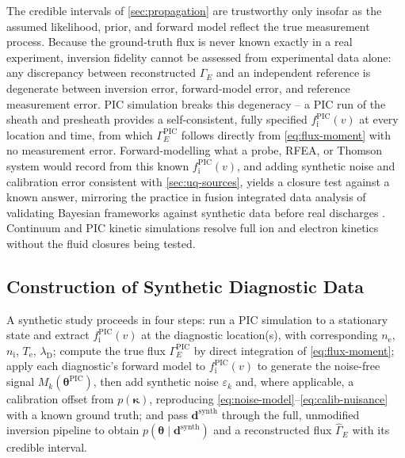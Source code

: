 The credible intervals of \cref{sec:propagation} are trustworthy only insofar as the assumed likelihood, prior, and forward model reflect the true measurement process. Because the ground-truth flux is never known exactly in a real experiment, inversion fidelity cannot be assessed from experimental data alone: any discrepancy between reconstructed $\Gamma_{E}$ and an independent reference is degenerate between inversion error, forward-model error, and reference measurement error. PIC simulation breaks this degeneracy -- a PIC run of the sheath and presheath provides a self-consistent, fully specified $f_{\mathrm{i}}^{\text{PIC}}(v)$ at every location and time, from which $\Gamma_{E}^{\text{PIC}}$ follows directly from \cref{eq:flux-moment} with no measurement error. Forward-modelling what a probe, RFEA, or Thomson system would record from this known $f_{\mathrm{i}}^{\text{PIC}}(v)$, and adding synthetic noise and calibration error consistent with \cref{sec:uq-sources}, yields a closure test against a known answer, mirroring the practice in fusion integrated data analysis of validating Bayesian frameworks against synthetic data before real discharges \cite{ref0706,ref0712}. Continuum and PIC kinetic simulations resolve full ion and electron kinetics without the fluid closures being tested.

\subsection{Construction of Synthetic Diagnostic Data}
\label{subsec:synthetic-construction}

A synthetic study proceeds in four steps: run a PIC simulation to a stationary state and extract $f_{\mathrm{i}}^{\text{PIC}}(v)$ at the diagnostic location(s), with corresponding $n_{\mathrm{e}}$, $n_{\mathrm{i}}$, $T_{\mathrm{e}}$, $\lambda_{\mathrm{D}}$; compute the true flux $\Gamma_{E}^{\text{PIC}}$ by direct integration of \cref{eq:flux-moment}; apply each diagnostic's forward model to $f_{\mathrm{i}}^{\text{PIC}}(v)$ to generate the noise-free signal $M_{k}(\boldsymbol{\theta}^{\text{PIC}})$, then add synthetic noise $\varepsilon_{k}$ and, where applicable, a calibration offset from $p(\boldsymbol{\kappa})$, reproducing \cref{eq:noise-model}--\cref{eq:calib-nuisance} with a known ground truth; and pass $\mathbf{d}^{\text{synth}}$ through the full, unmodified inversion pipeline to obtain $p(\boldsymbol{\theta} \mid \mathbf{d}^{\text{synth}})$ and a reconstructed flux $\hat{\Gamma}_{E}$ with its credible interval.

